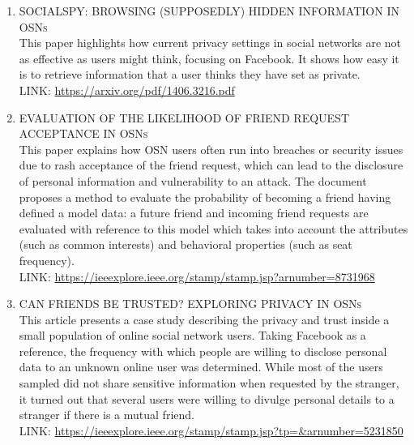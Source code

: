 \begin{enumerate}
	\item
	\textsc{SOCIALSPY: BROWSING (SUPPOSEDLY) HIDDEN INFORMATION IN OSNs}
	\\ This paper highlights how current privacy settings in social networks are not as effective as users might think, focusing on Facebook. It shows how easy it is to retrieve information that a user thinks they have set as private.
	\\ LINK: \href{https://arxiv.org/pdf/1406.3216.pdf}{https://arxiv.org/pdf/1406.3216.pdf}
	
	\item 
	\textsc{EVALUATION OF THE LIKELIHOOD OF FRIEND REQUEST ACCEPTANCE IN OSNs}
	\\ This paper explains how OSN users often run into breaches or security issues due to rash acceptance of the friend request, which can lead to the disclosure of personal information and vulnerability to an attack. The document proposes a method to evaluate the probability of becoming a friend having defined a model data: a future friend and incoming friend requests are evaluated with reference to this model which takes into account the attributes (such as common interests) and behavioral properties (such as seat frequency).
	\\ LINK: \href{https://ieeexplore.ieee.org/stamp/stamp.jsp?arnumber=8731968}{https://ieeexplore.ieee.org/stamp/stamp.jsp?arnumber=8731968}
	
	\item
	\textsc{CAN FRIENDS BE TRUSTED? EXPLORING PRIVACY IN OSNs}
	\\ This article presents a case study describing the privacy and trust inside a small population of online social network users. Taking Facebook as a reference, the frequency with which people are willing to disclose personal data to an unknown online user was determined. While most of the users sampled did not share sensitive information when requested by the stranger, it turned out that several users were willing to divulge personal details to a stranger if there is a mutual friend.
	\\ LINK: \href{https://ieeexplore.ieee.org/stamp/stamp.jsp?tp=\&arnumber=5231850}{https://ieeexplore.ieee.org/stamp/stamp.jsp?tp=\&arnumber=5231850}		
	

\end{enumerate}
